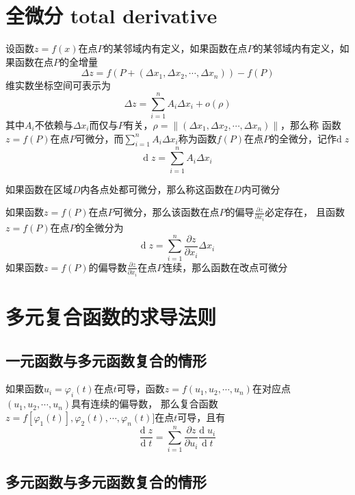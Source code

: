 \documentclass[UTF8]{ctexart}
\newcommand{\dif}[1]{{\text{d}\;\!#1}}
\begin{document}
\section*{全微分 total derivative}

\bigskip

设函数$z=f(x)$在点$P$的某邻域内有定义，如果函数在点$P$的某邻域内有定义，如果函数在点$P$的全增量
\[\Delta z=f(P+(\Delta x_1,\Delta x_2,\cdots,\Delta x_n))-f(P)\]
维实数坐标空间可表示为
\[\Delta z=\sum^n_{i=1}A_i\Delta x_i+o(\rho)\]
其中$A_i$不依赖与$\Delta x_i$而仅与$P$有关，$\rho=\|(\Delta x_1,\Delta x_2,\cdots,\Delta x_n)\|$，那么称
函数$z=f(P)$在点$P$可微分，而$\displaystyle \sum^n_{i=1}A_i\Delta x_i$称为函数$f(P)$在点$P$的全微分，记作$\dif{z}$
\[\dif{z}=\sum^n_{i=1}A_i\Delta x_i\]

\bigskip

如果函数在区域$D$内各点处都可微分，那么称这函数在$D$内可微分

\bigskip

如果函数$z=f(P)$在点$P$可微分，那么该函数在点$P$的偏导$\frac{\partial z}{\partial x_i}$必定存在，
且函数$z=f(P)$在点$P$的全微分为
\[\dif{z}=\sum^n_{i=1}\frac{\partial z}{\partial x_i}\Delta x_i\]
如果函数$z=f(P)$的偏导数$\frac{\partial z}{\partial x_i}$在点$P$连续，那么函数在改点可微分
\bigskip
\bigskip

\section*{多元复合函数的求导法则}

\bigskip

\subsection*{一元函数与多元函数复合的情形}
如果函数$u_i=\varphi_i(t)$在点$t$可导，函数$z=f(u_1,u_2,\cdots,u_n)$在对应点$(u_1,u_2,\cdots,u_n)$具有连续的偏导数，
那么复合函数$z=f[\varphi_1(t)],\varphi_2(t),\cdots,\varphi_n(t)]$在点$t$可导，且有
\[\frac{\dif{z}}{\dif{t}}=\sum^n_{i=1}\frac{\partial z}{\partial u_i}\frac{\dif{u_i}}{\dif{t}}\]

\subsection{多元函数与多元函数复合的情形}
\end{document}
